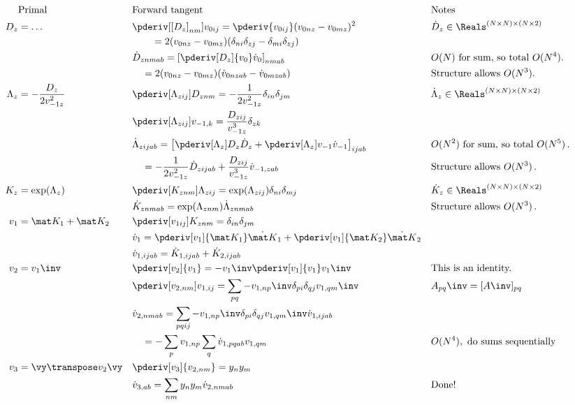 \begin{align}
&\text{Primal} && \text{Forward tangent} && \text{Notes} \nonumber \\
D_z &= \dots && \pderiv[{[D_z]}_{nm}]{v_{0ij}} = \pderiv{v_{0ij}} (v_{0nz} - v_{0mz})^2 &&  \dot D_z \in \Reals^{(N\times N) \times (N\times 2)}  \nonumber \\
& && \qquad = 2(v_{0nz} - v_{0mz})(\delta_{ni}\delta_{zj} - \delta_{mi}\delta_{zj}) &&\\
& && \dot D_{znmab} = \left[\pderiv[D_z]{v_0} \dot v_0\right]_{nmab} && O(N) \text{ for sum, so total } O(N^4). \\
& && \quad = 2 (v_{0nz} - v_{0mz}) (\dot v_{0nzab} - \dot v_{0mzab})&& \text{Structure allows } O(N^3). \\
\Lambda_z &= - \frac{D_z}{2v_{-1z}^2} && \pderiv[\Lambda_{zij}]{D_{znm}} = - \frac{1}{2v_{-1z}^2}\delta_{in}\delta_{jm}  && \dot \Lambda_z \in \Reals^{(N\times N) \times (N\times 2)} \\
& && \pderiv[\Lambda_{zij}]{v_{-1,k}} = \frac{D_{zij}}{v_{-1z}^3} \delta_{zk} && \\
& && \dot \Lambda_{zijab} = \left[\pderiv[\Lambda_{z}]{D_{z}} \dot D_{z} + \pderiv[\Lambda_{z}]{v_{-1}} \dot v_{-1}\right]_{ijab} && O(N^2)\text{ for sum, so total }O(N^5)\,. \\
& && \quad = - \frac{1}{2v_{-1z}^2} \dot D_{zijab} + \frac{D_{zij}}{v_{-1z}^3} \dot v_{-1,zab} && \text{Structure allows } O(N^3)\,. \\
K_z &= \exp(\Lambda_z) && \pderiv[K_{znm}]{\Lambda_{zij}} = \exp(\Lambda_{zij})\delta_{ni}\delta_{mj} && \dot K_z \in \Reals^{(N\times N)\times (N\times 2)} \\
& && \dot K_{znmab} = \exp(\Lambda_{znm})\dot\Lambda_{znmab} && \text{Structure allows } O(N^3)\,. \\
v_1 &= \mat K_1 + \mat K_2 && \pderiv[v_{1ij}]{K_{znm}} = \delta_{in}\delta_{jm} && \\
& && \dot v_1 = \pderiv[v_1]{\mat K_1} \dot{\mat K}_1 + \pderiv[v_1]{\mat K_2} \dot{\mat K}_2 && \\
& && \dot v_{1,ijab} =  \dot K_{1,ijab} + \dot K_{2,ijab} && \\
v_2&= v_1\inv && \pderiv[v_2]{v_1} = -v_1\inv \pderiv[v_1]{v_1}v_1\inv && \text{This is an identity.} \\
& && \pderiv[v_{2,nm}]{v_{1,ij}} = \sum_{pq}-v_{1,np}\inv \delta_{pi}\delta_{qj} v_{1,qm}\inv && A_{pq}\inv = [A\inv]_{pq} \\
& && \dot v_{2,nmab} = \sum_{pqij} -v_{1,np}\inv \delta_{pi}\delta_{qj} v_{1,qm}\inv \dot v_{1,ijab} && \\
& && \quad = -\sum_{p} v_{1,np} \sum_q \dot v_{1,pqab} v_{1,qm} && O(N^4), \text{ do sums sequentially} \\
v_3 &= \vy\transpose v_2 \vy && \pderiv[v_3]{v_{2,nm}} = y_ny_m  && \\
& &&\dot v_{3,ab} = \sum_{nm} y_ny_m \dot v_{2,nmab} && \text{Done!}
\end{align}

